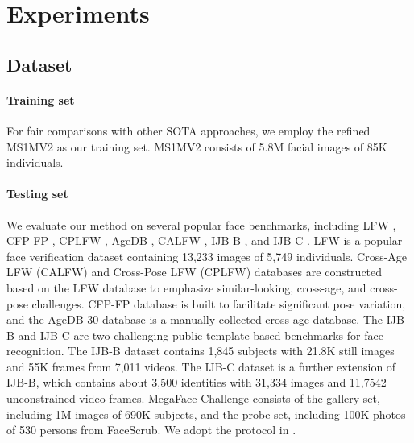 \documentclass[sigconf]{acmart}
\begin{document}
\section{Experiments}
\subsection{Dataset}
\paragraph{Training set}
For fair comparisons with other SOTA approaches, we employ the refined MS1MV2 \cite{arcface} as our training set. MS1MV2 consists of 5.8M facial images of 85K individuals.
\paragraph{Testing set}
We evaluate our method on several popular face benchmarks, including LFW \cite{lfw}, CFP-FP \cite{cfp-fp}, CPLFW \cite{cplfw}, AgeDB \cite{agedb}, CALFW \cite{calfw}, IJB-B \cite{ijb-b}, and IJB-C \cite{ijb-c}. LFW is a popular face verification dataset containing 13,233 images of 5,749 individuals.  Cross-Age LFW (CALFW) and Cross-Pose LFW (CPLFW) databases are constructed based on the LFW database to emphasize similar-looking, cross-age, and cross-pose challenges. CFP-FP database is built to facilitate significant pose variation, and the AgeDB-30 database is a manually collected cross-age database. The IJB-B and IJB-C are two challenging public template-based benchmarks for face recognition. The IJB-B dataset contains 1,845 subjects with 21.8K still images and 55K frames from 7,011 videos. The IJB-C dataset is a further extension of IJB-B, which contains about 3,500 identities with 31,334 images and 11,7542 unconstrained video frames. MegaFace Challenge \cite{megaface} consists of the gallery set, including 1M images of 690K subjects, and the probe set, including 100K photos of 530 persons from FaceScrub. We adopt the protocol in \cite{arcface}.
\end{document}
